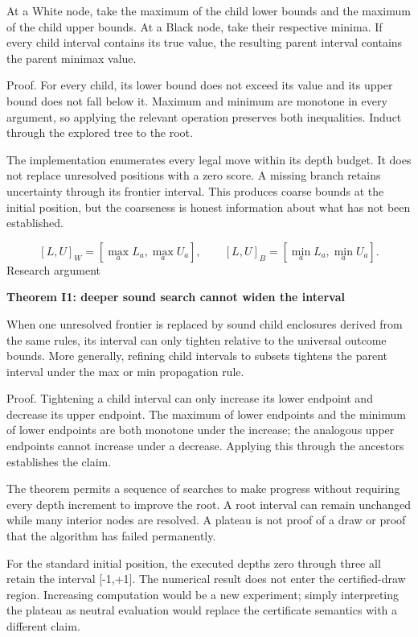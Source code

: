 \documentclass[10pt]{article}
\begin{document}
At a White node, take the maximum of the child lower bounds and the maximum of the child upper bounds. At a Black node, take their respective minima. If every child interval contains its true value, the resulting parent interval contains the parent minimax value.\par
Proof. For every child, its lower bound does not exceed its value and its upper bound does not fall below it. Maximum and minimum are monotone in every argument, so applying the relevant operation preserves both inequalities. Induct through the explored tree to the root.\par
The implementation enumerates every legal move within its depth budget. It does not replace unresolved positions with a zero score. A missing branch retains uncertainty through its frontier interval. This produces coarse bounds at the initial position, but the coarseness is honest information about what has not been established.\par
\[[L,U]_W=[\max_a L_a,\max_a U_a],\qquad[L,U]_B=[\min_a L_a,\min_a U_a].\]
\clearpage
{\small\color{accent}Research argument}\par
{\LARGE\bfseries\color{ink}Theorem I1: deeper sound search cannot widen the interval}\par\vspace{7pt}
When one unresolved frontier is replaced by sound child enclosures derived from the same rules, its interval can only tighten relative to the universal outcome bounds. More generally, refining child intervals to subsets tightens the parent interval under the max or min propagation rule.\par
Proof. Tightening a child interval can only increase its lower endpoint and decrease its upper endpoint. The maximum of lower endpoints and the minimum of lower endpoints are both monotone under the increase; the analogous upper endpoints cannot increase under a decrease. Applying this through the ancestors establishes the claim.\par
The theorem permits a sequence of searches to make progress without requiring every depth increment to improve the root. A root interval can remain unchanged while many interior nodes are resolved. A plateau is not proof of a draw or proof that the algorithm has failed permanently.\par
For the standard initial position, the executed depths zero through three all retain the interval [-1,+1]. The numerical result does not enter the certified-draw region. Increasing computation would be a new experiment; simply interpreting the plateau as neutral evaluation would replace the certificate semantics with a different claim.\par
\end{document}
